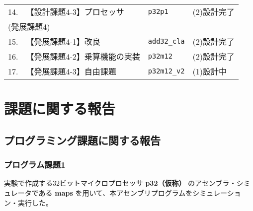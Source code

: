 \documentclass[autodetect-engine,dvi=dvipdfmx,ja=standard,
               a4j,11pt]{bxjsarticle}
\begin{document}
\begin{table}[b]
\begin{center}
{\begin{tabular}{rll|l}
    14. & 【設計課題4-3】プロセッサ      & \verb|p32p1|          & (2)設計完了 \\
    \multicolumn{3}{l|}{(発展課題4)} & \\
    15. & 【発展課題4-1】改良            & \verb|add32_cla|      & (2)設計完了 \\
    16. & 【発展課題4-2】乗算機能の実装  &  \verb|p32m12|         & (2)設計完了 \\
    17. & 【発展課題4-3】自由課題        &  \verb|p32m12_v2|      & (1)設計中 \\
    \hline
    \end{tabular}
    }
    \end{center}
    \end{table}
    \clearpage
\section{課題に関する報告}
\subsection{プログラミング課題に関する報告}
\subsubsection*{プログラム課題1}
実験で作成する32ビットマイクロプロセッサ \textbf{p32（仮称）} のアセンブラ・シミュレータである \textbf{maps} を用いて、本アセンブリプログラムをシミュレーション・実行した。
\end{document}
